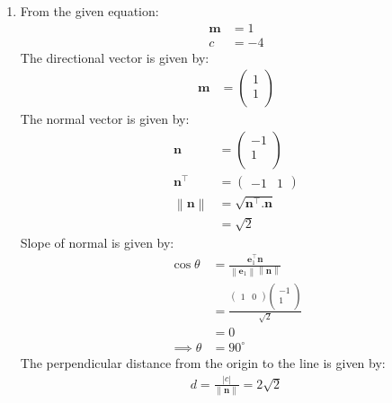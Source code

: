 \documentclass[12pt]{article}
\providecommand{\norm}[1]{\left\lVert#1\right\rVert}
\newcommand{\myvec}[1]{\ensuremath{\begin{pmatrix}#1\end{pmatrix}}}
\let\vec\mathbf
\begin{document}
\begin{enumerate}
	
\item From the given equation:
         \begin{align}                                    \vec{m}&=1\\                                  		c&=-4
         \end{align}                                                                                          The directional vector is given by:
          \begin{align}
                  \vec{m}&=\myvec{1\\1\\}
          \end{align}
          The normal vector is given by:
                  \begin{align}
         \vec{n}&=\myvec{-1\\1\\}\\
          \vec{n}^\top&=\myvec{-1 & 1}\\
                       \norm{\vec{n}}&=\sqrt{\vec{n}^\top.\vec{n}}\\
                          &=\sqrt{2}
                          \end{align}
          Slope of normal is given by:
		\begin{align}   
              \cos\theta&=\frac{\vec{e}_{1}^\top\vec{n}}{\norm{\vec{e}_{1}}\norm{\vec{n}}}\\
			&=\frac{\myvec{1&0}\myvec{-1 \\ 1\\}}{\sqrt{2}}\\
			&=0\\
			\implies	\theta&=90^\circ
                \end{align}                                                                                
 The perpendicular distance from the origin to the line is given by:                                          \begin{align}
			d=\frac{|c|}{\norm{\vec{n}}}=2\sqrt{2}                                                    
                  \end{align}


\end{enumerate}
\end{document}
